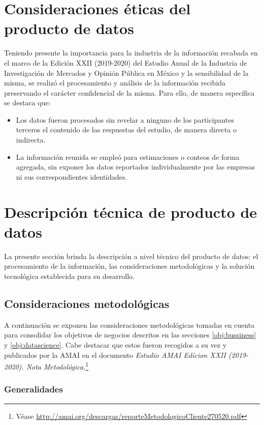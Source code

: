 \section{Consideraciones éticas del producto de datos}

Teniendo presente la importancia para la industria de la información recabada en el marco de la Edición XXII (2019-2020) del Estudio Anual de la Industria de Investigación de Mercados y Opinión Pública en México y la sensibilidad de la misma, se realizó el procesamiento y análisis de la información recibida preservando el carácter confidencial de la misma. Para ello, de manera específica se destaca que:

\begin{itemize}
 \item Los datos fueron procesados sin revelar a ninguno de los participantes terceros el contenido de las respuestas del estudio, de manera directa o indirecta.
 \item  La información reunida se empleó para estimaciones o conteos de forma agregada, sin exponer los datos reportados individualmente por las empresas ni sus correspondientes identidades.
 \end{itemize}

\section{Descripción técnica de producto de datos}

La presente sección brinda la descripción a nivel técnico del producto de datos: el procesamiento de la información, las consideraciones metodológicas y la solución tecnológica establecida para su desarrollo.

\subsection{Consideraciones metodológicas}

A continuación se exponen las consideraciones metodológicas tomadas en cuenta para consolidar los objetivos de negocios descritos en las secciones \ref{obj:bussiness} y \ref{obj:datascience}. Cabe destacar que estos fueron recogidos a su vez y publicados por la AMAI en el documento \emph{Estudio AMAI Edicion XXII (2019-2020). Nota Metodológica.}\footnote{Véase \url{http://amai.org/descargas/reporteMetodologicoCliente270520.pdf}}

\subsubsection{Generalidades}

